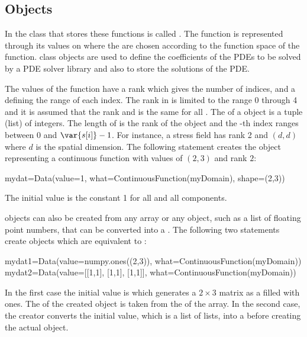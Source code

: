 \subsection{\Data Objects}
In \escript the class that stores these functions is called \Data.
The function is represented through its values on \DataSamplePoints where
the \DataSamplePoints are chosen according to the function space of the
function.
\Data class objects are used to define the coefficients of the PDEs to be
solved by a PDE solver library and also to store the solutions of the PDE.

The values of the function have a rank which gives the number of indices,
and a \Shape defining the range of each index.
The rank in \escript is limited to the range 0 through 4 and it is assumed
that the rank and \Shape is the same for all \DataSamplePoints.
The \Shape of a \Data object is a tuple (list)  of integers.
The length of  is the rank of the \Data object and the -th
index ranges between 0 and $\var{s[i]}-1$.
For instance, a stress field has rank 2 and \Shape $(d,d)$ where $d$ is the
spatial dimension.
The following statement creates the \Data object  representing a
continuous function with values of \Shape $(2,3)$ and rank $2$:
\begin{python}
  mydat=Data(value=1, what=ContinuousFunction(myDomain), shape=(2,3))
\end{python}
The initial value is the constant 1 for all \DataSamplePoints and all
components.

\Data objects can also be created from any \numpy array or any object, such
as a list of floating point numbers, that can be converted into
a \numpyNDA\cite{NUMPY}.
The following two statements create objects which are equivalent
to :
\begin{python}
  mydat1=Data(value=numpy.ones((2,3)), what=ContinuousFunction(myDomain))
  mydat2=Data(value=[[1,1], [1,1], [1,1]], what=ContinuousFunction(myDomain))
\end{python}
In the first case the initial value is  which generates
a $2 \times 3$ matrix as a \numpyNDA filled with ones.
The \Shape of the created \Data object is taken from the \Shape of the array.
In the second case, the creator converts the initial value, which is a list of
lists, into a \numpyNDA before creating the actual \Data object.

